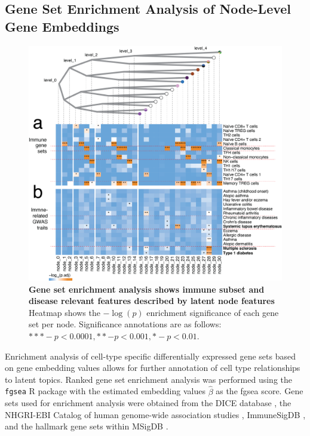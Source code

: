 \subsection{Gene Set Enrichment Analysis of Node-Level Gene Embeddings}

\begin{figure}
    \centering
    \includegraphics[width=\textwidth]{Figures/gsea.png}
    \caption{\textbf{Gene set enrichment analysis shows immune subset and disease relevant features described by latent node features} Heatmap shows the $-\log(p)$ enrichment significance of each gene set per node. Significance annotations are as follows: $*** - p < 0.0001, ** - p < 0.001, * - p < 0.01$.}
    \label{fig:gsea}
\end{figure}

Enrichment analysis of cell-type specific differentially expressed gene sets based on gene embedding values allows for further annotation of cell type relationships to latent topics. Ranked gene set enrichment analysis was performed using the \texttt{fgsea} R package \cite{fgsea} with the estimated embedding values $\hat{\beta}$ as the fgsea score. Gene sets used for enrichment analysis were obtained from the DICE database \cite{DICE1}, the NHGRI-EBI Catalog of human genome-wide association studies \cite{gwas_cat}, ImmuneSigDB \cite{godec2016compendium}, and the hallmark gene sets within MSigDB \cite{liberzon2015molecular}.

